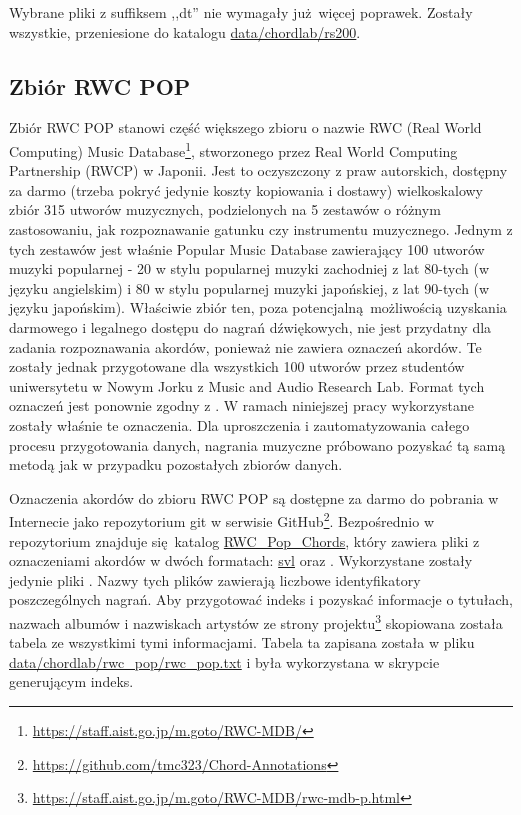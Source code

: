 Wybrane pliki z suffiksem ,,dt'' nie wymagały już więcej poprawek. Zostały wszystkie, przeniesione
do katalogu \url{data/chordlab/rs200}.

\subsection{Zbiór RWC POP}

Zbiór RWC POP \cite{goto_rwc_nodate} stanowi część większego zbioru o nazwie RWC (Real World
Computing) Music Database\footnote{\url{https://staff.aist.go.jp/m.goto/RWC-MDB/}}, stworzonego przez Real
World Computing Partnership (RWCP) w Japonii. Jest to oczyszczony z praw autorskich, dostępny za
darmo (trzeba pokryć jedynie koszty kopiowania i dostawy) wielkoskalowy zbiór 315 utworów
muzycznych, podzielonych na 5 zestawów o różnym zastosowaniu, jak rozpoznawanie gatunku czy
instrumentu muzycznego. Jednym z tych zestawów jest właśnie Popular Music Database zawierający 100
utworów muzyki popularnej - 20 w stylu popularnej muzyki zachodniej z lat 80-tych (w języku
angielskim) i 80 w stylu popularnej muzyki japońskiej, z lat 90-tych (w języku japońskim). Właściwie
zbiór ten, poza potencjalną możliwością uzyskania darmowego i legalnego dostępu do nagrań
dźwiękowych, nie jest przydatny dla zadania rozpoznawania akordów, ponieważ nie zawiera oznaczeń
akordów. Te zostały jednak przygotowane dla wszystkich 100 utworów przez studentów uniwersytetu w
Nowym Jorku z Music and Audio Research Lab. Format tych oznaczeń jest ponownie zgodny z
\cite{harte_towards_nodate}. W ramach niniejszej pracy wykorzystane zostały właśnie te oznaczenia.
Dla uproszczenia i zautomatyzowania całego procesu przygotowania danych, nagrania muzyczne próbowano
pozyskać tą samą metodą jak w przypadku pozostałych zbiorów danych.

Oznaczenia akordów do zbioru RWC POP są dostępne za darmo do pobrania w Internecie jako repozytorium
git w serwisie GitHub\footnote{\url{https://github.com/tmc323/Chord-Annotations}}. Bezpośrednio w
repozytorium znajduje się katalog \url{RWC_Pop_Chords}, który zawiera pliki z oznaczeniami akordów w
dwóch formatach: \url{svl} oraz . Wykorzystane zostały jedynie pliki . Nazwy
tych plików zawierają liczbowe identyfikatory poszczególnych nagrań. Aby przygotować indeks i
pozyskać informacje o tytułach, nazwach albumów i nazwiskach artystów ze strony
projektu\footnote{\url{https://staff.aist.go.jp/m.goto/RWC-MDB/rwc-mdb-p.html}} skopiowana została tabela
ze wszystkimi tymi informacjami. Tabela ta zapisana została w pliku
\url{data/chordlab/rwc_pop/rwc_pop.txt} i była wykorzystana w skrypcie generującym indeks.

